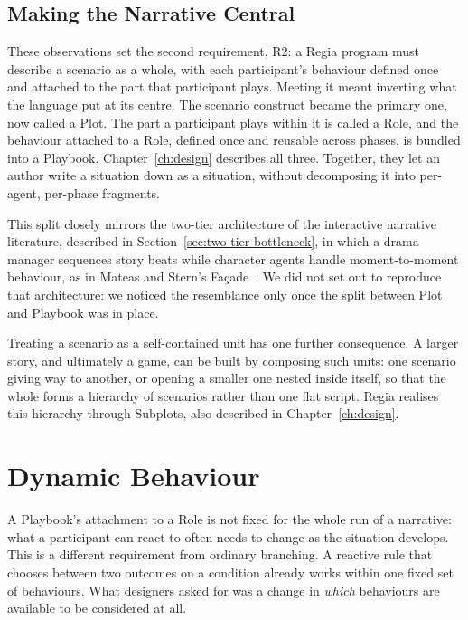 \subsection{Making the Narrative Central}
 
These observations set the second requirement, R2: a Regia program must describe a scenario as a whole, with each participant's behaviour defined once and attached to the part that participant plays. Meeting it meant inverting what the language put at its centre. The scenario construct became the primary one, now called a Plot. The part a participant plays within it is called a Role, and the behaviour attached to a Role, defined once and reusable across phases, is bundled into a Playbook. Chapter~\ref{ch:design} describes all three. Together, they let an author write a situation down as a situation, without decomposing it into per-agent, per-phase fragments.
 
This split closely mirrors the two-tier architecture of the interactive narrative literature, described in Section~\ref{sec:two-tier-bottleneck}, in which a drama manager sequences story beats while character agents handle moment-to-moment behaviour, as in Mateas and Stern's Fa\c{c}ade~\cite{Mateas2005}. We did not set out to reproduce that architecture: we noticed the resemblance only once the split between Plot and Playbook was in place.
 
Treating a scenario as a self-contained unit has one further consequence. A larger story, and ultimately a game, can be built by composing such units: one scenario giving way to another, or opening a smaller one nested inside itself, so that the whole forms a hierarchy of scenarios rather than one flat script. Regia realises this hierarchy through Subplots, also described in Chapter~\ref{ch:design}.



\section{Dynamic Behaviour}
\label{sec:dynamic-behavior}
 
A Playbook's attachment to a Role is not fixed for the whole run of a narrative: what a participant can react to often needs to change as the situation develops. This is a different requirement from ordinary branching. A reactive rule that chooses between two outcomes on a condition already works within one fixed set of behaviours. What designers asked for was a change in \emph{which} behaviours are available to be considered at all.
 
